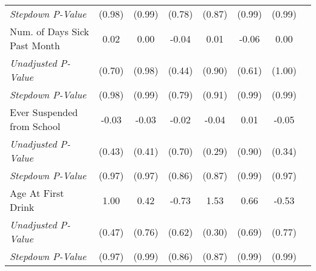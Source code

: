 \begin{tabular}{l c c c c c c c}
\quad \textit{Stepdown P-Value} & (0.98) & (0.99) & (0.78) & (0.87) & (0.99) & (0.99) \\
Num. of Days Sick Past Month & 0.02 & 0.00 & -0.04 & 0.01 & -0.06 & 0.00 \\
\quad \textit{Unadjusted P-Value} & (0.70) & (0.98) & (0.44) & (0.90) & (0.61) & (1.00) \\
\quad \textit{Stepdown P-Value} & (0.98) & (0.99) & (0.79) & (0.91) & (0.99) & (0.99) \\
Ever Suspended from School & -0.03 & -0.03 & -0.02 & -0.04 & 0.01 & -0.05 \\
\quad \textit{Unadjusted P-Value} & (0.43) & (0.41) & (0.70) & (0.29) & (0.90) & (0.34) \\
\quad \textit{Stepdown P-Value} & (0.97) & (0.97) & (0.86) & (0.87) & (0.99) & (0.97) \\
Age At First Drink & 1.00 & 0.42 & -0.73 & 1.53 & 0.66 & -0.53 \\
\quad \textit{Unadjusted P-Value} & (0.47) & (0.76) & (0.62) & (0.30) & (0.69) & (0.77) \\
\quad \textit{Stepdown P-Value} & (0.97) & (0.99) & (0.86) & (0.87) & (0.99) & (0.99) \\
\bottomrule
\end{tabular}
